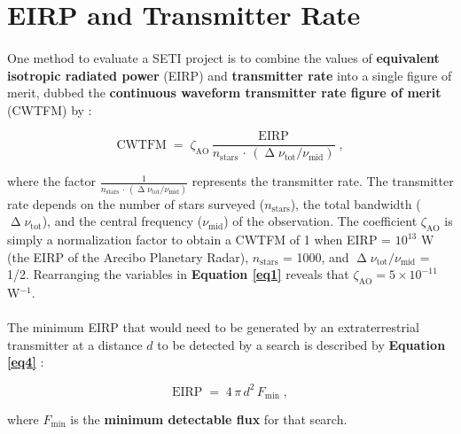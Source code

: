 \documentclass{article}
\begin{document}
\section{EIRP and Transmitter Rate}

\paragraph{}
One method to evaluate a SETI project is to combine the values of \textbf{equivalent isotropic radiated power} (EIRP) and \textbf{transmitter rate} into a single figure of merit, dubbed the \textbf{continuous waveform transmitter rate figure of merit} (CWTFM) by \citet{Enriquez_2017}:

\begin{equation}
\textrm{CWTFM} \; = \; \zeta_{\textrm{AO}} \, \frac{\textrm{EIRP}}{n_{\textrm{stars}} \, \cdot \, (\upDelta \nu_{\textrm{tot}} / \nu_{\textrm{mid}})} \; ,
\label{eq1}
\end{equation}

where the factor $\frac{1}{n_{\textrm{stars}} \, \cdot \, (\upDelta \nu_{\textrm{tot}} / \nu_{\textrm{mid}})}$ represents the transmitter rate. The transmitter rate depends on the number of stars surveyed ($n_{\textrm{stars}}$), the total bandwidth ($\upDelta \nu_{\textrm{tot}}$), and the central frequency ($\nu_{\textrm{mid}}$) of the observation. The coefficient $\zeta_{\textrm{AO}}$ is simply a normalization factor to obtain a CWTFM of 1 when EIRP = $10^{13}$ W (the EIRP of the Arecibo Planetary Radar),  $n_{\textrm{stars}}$ = 1000, and $\upDelta \nu_{\textrm{tot}} / \nu_{\textrm{mid}}$ = 1/2. Rearranging the variables in \textbf{Equation \ref{eq1}} reveals that $\zeta_{\textrm{AO}} = 5 \times 10^{-11}$ W$^{-1}$.

\paragraph{}
The minimum EIRP that would need to be generated by an extraterrestrial transmitter at a distance $d$ to be detected by a search is described by \textbf{Equation \ref{eq4}} \citep{10.1093/mnras/staa2672}:

\begin{equation}
\textrm{EIRP} \; = \; 4 \, \pi \, d^2 \, F_{\textrm{min}} \; ,
\label{eq4}
\end{equation}

where $F_{\textrm{min}}$ is the \textbf{minimum detectable flux} for that search.
\end{document}
